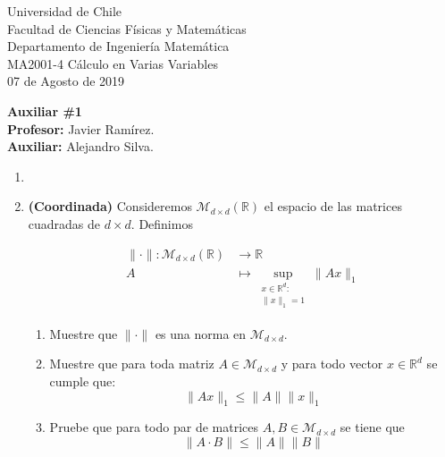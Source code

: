 \documentclass[letterpaper]{article}
\let\max=\undefined\DeclareMathOperator*{\max}{\text{máx}}
\newcommand{\R}{\mathbb{R}}
\newcommand{\enc}[3]{\Large \textbf{#1}\\ \normalsize #2\\ #3}
\newcommand{\norm}[1]{\lVert #1\rVert }
\newcommand{\vabs}[1]{\lvert #1\rvert}
\begin{document}
	
	\noindent Universidad de Chile\\ Facultad de Ciencias Físicas y Matemáticas\\Departamento de Ingeniería Matemática\\ MA2001-4 Cálculo en Varias Variables\\ 07 de Agosto de 2019
	\begin{center}
		\enc{Auxiliar \#1} {\textbf{Profesor:} Javier Ramírez.} {\textbf{Auxiliar:} Alejandro Silva.}
	\end{center}
	
	

	\vspace{-0.6cm}
	\begin{enumerate}\setlength{\itemsep}{0.4cm}	
		\item[]


\item \textbf{(Coordinada)} Consideremos $\mathcal{M}_{d\times d}(\R)$ el espacio de las matrices cuadradas de $d\times d$. Definimos

\begin{align*}
\norm{\cdot} : \mathcal{M}_{d\times d}(\R)&\to\R\\
A & \mapsto \sup_{\substack{x\in\R^d :\\
                  \norm{x}_1=1}}\norm{Ax}_1
\end{align*}



\begin{enumerate}





\item Muestre que $\norm{\cdot}$ es una norma en $\mathcal{M}_{d\times d}$.
\item Muestre que para toda matriz $A\in\mathcal{M}_{d\times d}$ y para todo vector $x\in \R^d$ se cumple que:
\[\norm{Ax}_{1}\leq \norm{A}\norm{x}_1\]
\item Pruebe que para todo par de matrices $A,B\in\mathcal{M}_{d \times d}$ se tiene que
\[\norm{A\cdot B}\leq \norm{A}\norm{B}\]
\end{enumerate}	


\end{enumerate}
\end{document}

